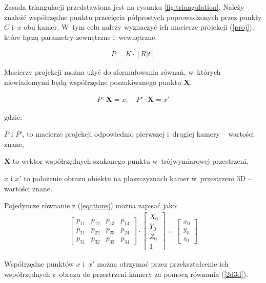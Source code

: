 Zasada triangulacji przedstawiona jest na rysunku \ref{fig:triangulation}. Należy znaleźć współrzędne punktu przecięcia półprostych poprowadzonych przez punkty $C$ i~$x$ obu kamer. W~tym celu należy wyznaczyć ich macierze projekcji (\ref{proj}), które łączą parametry zewnętrzne i~wewnętrzne.

\begin{align}
    P = K \cdot [R | t] \label{proj}
\end{align}

Macierzy projekcji można użyć do sformułowania równań, w~których niewiadomymi będą współrzędne poszukiwanego punktu $\mathbf{X}$.

\begin{align}
    P \cdot \mathbf{X} = x, \quad P' \cdot \mathbf{X} = x' \label{eqations}
\end{align}

\noindent gdzie:

$P$ i $P'$, to macierze projekcji odpowiednio pierwszej i~drugiej kamery -- wartości znane,

$\mathbf{X}$ to wektor współrzędnych szukanego punktu w~trójwymiarowej przestrzeni,

$x$ i $x'$ to położenie obrazu obiektu na płaszczyznach kamer w~przestrzeni 3D -- wartości znane.

\vspace{11px}
Pojedyncze równanie z (\ref{eqations}) można zapisać jako:
\begin{align}
    \begin{bmatrix}
        p_{11} & p_{12} & p_{13} & p_{14} \\
        p_{21} & p_{22} & p_{23} & p_{24} \\
        p_{31} & p_{32} & p_{33} & p_{34}
\end{bmatrix} \cdot 
\begin{bmatrix}
    X_0 \\
    Y_0 \\
    Z_0 \\
    1
\end{bmatrix} = 
\begin{bmatrix}
    x_0 \\
    y_0 \\
    z_0
\end{bmatrix}
\end{align}

Współrzędne punktów $x$ i~$x'$ można otrzymać przez przekształcenie ich współrzędnych z~obrazu do przestrzeni kamery za pomocą równania (\ref{2d3d}).

